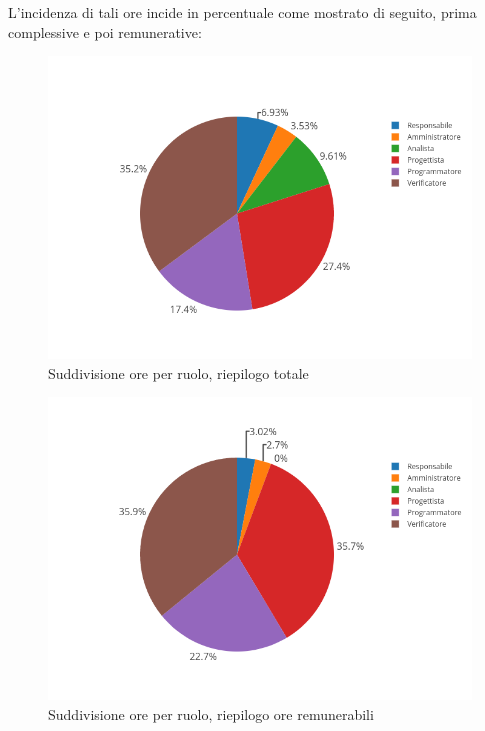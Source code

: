 L'incidenza di tali ore incide in percentuale come mostrato di seguito, prima complessive e poi remunerative:
\begin{figure}[H]
	\centering
	\includegraphics[scale=0.6]{img/OreTotali.png}
	\caption{Suddivisione ore per ruolo, riepilogo totale}
\end{figure}
\begin{figure}[H]
	\centering
	\includegraphics[scale=0.6]{img/OreRendicontabili.png}
	\caption{Suddivisione ore per ruolo, riepilogo ore remunerabili}
\end{figure}


